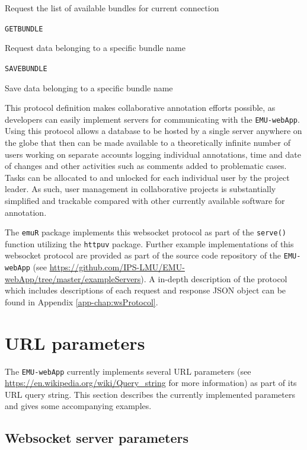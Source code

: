 \documentclass[]{book}
\theoremstyle{definition}
\theoremstyle{definition}
\theoremstyle{definition}
\theoremstyle{remark}
\begin{document}
Request the list of available bundles for current connection

\texttt{GETBUNDLE}

Request data belonging to a specific bundle name

\texttt{SAVEBUNDLE}

Save data belonging to a specific bundle name

This protocol definition makes collaborative annotation efforts
possible, as developers can easily implement servers for communicating
with the \texttt{EMU-webApp}. Using this protocol allows a database to
be hosted by a single server anywhere on the globe that then can be made
available to a theoretically infinite number of users working on
separate accounts logging individual annotations, time and date of
changes and other activities such as comments added to problematic
cases. Tasks can be allocated to and unlocked for each individual user
by the project leader. As such, user management in collaborative
projects is substantially simplified and trackable compared with other
currently available software for annotation.

The \texttt{emuR} package implements this websocket protocol as part of
the \texttt{serve()} function utilizing the \texttt{httpuv} package.
Further example implementations of this websocket protocol are provided
as part of the source code repository of the \texttt{EMU-webApp} (see
\url{https://github.com/IPS-LMU/EMU-webApp/tree/master/exampleServers}).
A in-depth description of the protocol which includes descriptions of
each request and response JSON object can be found in Appendix
\ref{app-chap:wsProtocol}.

\hypertarget{url-parameters}{%
\section{URL parameters}\label{url-parameters}}

The \texttt{EMU-webApp} currently implements several URL parameters (see
\url{https://en.wikipedia.org/wiki/Query_string} for more information)
as part of its URL query string. This section describes the currently
implemented parameters and gives some accompanying examples.

\hypertarget{websocket-server-parameters}{%
\subsection{Websocket server
parameters}\label{websocket-server-parameters}}
\end{document}
